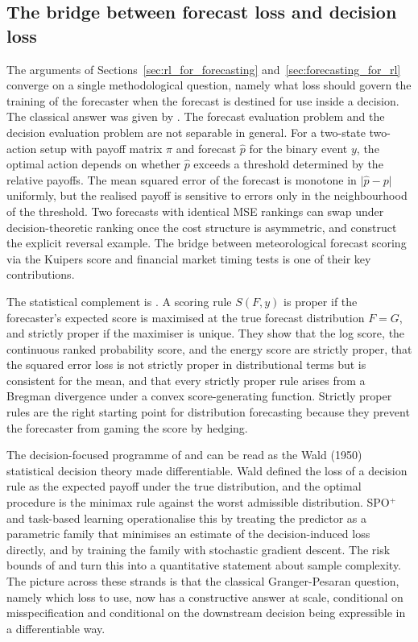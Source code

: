 \subsection{The bridge between forecast loss and decision loss}
\label{sec:bridge}

The arguments of Sections~\ref{sec:rl_for_forecasting} and~\ref{sec:forecasting_for_rl}
converge on a single methodological question, namely what loss should govern the
training of the forecaster when the forecast is destined for use inside a decision.
The classical answer was given by \citet{GrangerPesaran2000}. The forecast
evaluation problem and the decision evaluation problem are not separable in general.
For a two-state two-action setup with payoff matrix $\pi$ and forecast $\hat p$
for the binary event $y$, the optimal action depends on whether $\hat p$ exceeds a
threshold determined by the relative payoffs. The mean squared error of the
forecast is monotone in $\lvert \hat p - p \rvert$ uniformly, but the realised
payoff is sensitive to errors only in the neighbourhood of the threshold. Two
forecasts with identical MSE rankings can swap under decision-theoretic ranking
once the cost structure is asymmetric, and \citet{GrangerPesaran2000} construct
the explicit reversal example. The bridge between meteorological forecast scoring
via the Kuipers score and financial market timing tests is one of their key
contributions.

The statistical complement is \citet{GneitingRaftery2007}. A scoring rule
$S(F, y)$ is proper if the forecaster's expected score is maximised at the true
forecast distribution $F = G$, and strictly proper if the maximiser is unique. They
show that the log score, the continuous ranked probability score, and the energy
score are strictly proper, that the squared error loss is not strictly proper in
distributional terms but is consistent for the mean, and that every strictly proper
rule arises from a Bregman divergence under a convex score-generating function.
Strictly proper rules are the right starting point for distribution forecasting
because they prevent the forecaster from gaming the score by hedging.

The decision-focused programme of \citet{ElmachtoubGrigas2022} and
\citet{DontiAmosKolter2017} can be read as the Wald (1950) statistical decision
theory made differentiable. Wald defined the loss of a decision rule as the
expected payoff under the true distribution, and the optimal procedure is the
minimax rule against the worst admissible distribution. SPO$^+$ and task-based
learning operationalise this by treating the predictor as a parametric family
that minimises an estimate of the decision-induced loss directly, and by training
the family with stochastic gradient descent. The risk bounds of
\citet{LiuGrigas2021} and \citet{HuangGupta2024} turn this into a quantitative
statement about sample complexity. The picture across these strands is that the
classical Granger-Pesaran question, namely which loss to use, now has a
constructive answer at scale, conditional on misspecification and conditional on
the downstream decision being expressible in a differentiable way.

